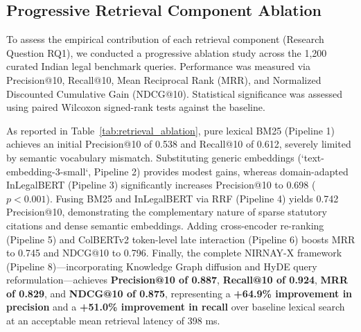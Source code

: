 \documentclass[conference]{IEEEtran}
\begin{document}
\subsection{Progressive Retrieval Component Ablation}
To assess the empirical contribution of each retrieval component (Research Question RQ1), we conducted a progressive ablation study across the 1,200 curated Indian legal benchmark queries. Performance was measured via Precision@10, Recall@10, Mean Reciprocal Rank (MRR), and Normalized Discounted Cumulative Gain (NDCG@10). Statistical significance was assessed using paired Wilcoxon signed-rank tests against the baseline.

As reported in Table~\ref{tab:retrieval_ablation}, pure lexical BM25 (Pipeline 1) achieves an initial Precision@10 of 0.538 and Recall@10 of 0.612, severely limited by semantic vocabulary mismatch. Substituting generic embeddings (`text-embedding-3-small`, Pipeline 2) provides modest gains, whereas domain-adapted InLegalBERT (Pipeline 3) significantly increases Precision@10 to 0.698 ($p < 0.001$). Fusing BM25 and InLegalBERT via RRF (Pipeline 4) yields 0.742 Precision@10, demonstrating the complementary nature of sparse statutory citations and dense semantic embeddings. Adding cross-encoder re-ranking (Pipeline 5) and ColBERTv2 token-level late interaction (Pipeline 6) boosts MRR to 0.745 and NDCG@10 to 0.796. Finally, the complete NIRNAY-X framework (Pipeline 8)—incorporating Knowledge Graph diffusion and HyDE query reformulation—achieves \textbf{Precision@10 of 0.887}, \textbf{Recall@10 of 0.924}, \textbf{MRR of 0.829}, and \textbf{NDCG@10 of 0.875}, representing a \textbf{+64.9\% improvement in precision} and a \textbf{+51.0\% improvement in recall} over baseline lexical search at an acceptable mean retrieval latency of 398 ms.
\end{document}
